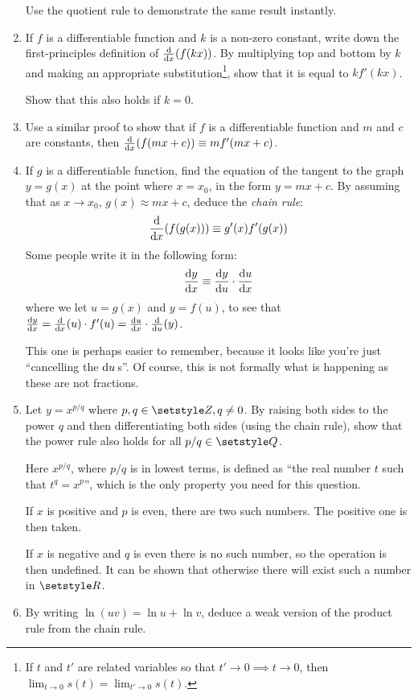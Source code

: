 \begin{enumerate}
  Use the quotient rule to demonstrate the same result instantly.
 \item
  If \(f\) is a differentiable function and \(k\) is a non-zero constant,
  write down the first-principles definition of \(\dv{x}(f(kx))\). By
  multiplying top and bottom by \(k\) and making an appropriate
  substitution\footnote{
   If \(t\) and \(t'\) are related variables so that
   \(t' \to 0 \implies t \to 0\), then
   \(\lim_{t \to 0} s(t) = \lim_{t' \to 0} s(t)\).
  }, show that it is equal to \(kf'(kx)\).

  Show that this also holds if \(k = 0\).
 \item
  Use a similar proof to show that if \(f\) is a differentiable function and
  \(m\) and \(c\) are constants, then \(\dv{x}(f(mx + c)) \equiv mf'(mx + c)\).
 \item
  If \(g\) is a differentiable function, find the equation of the tangent to the
  graph \(y = g(x)\) at the point where \(x = x_0\), in the form
  \(y = mx + c\). By assuming that as \(x \to x_0\), \(g(x) \approx mx + c\),
  deduce the \emph{chain rule}:
  \begin{equation*}
   \dv{x}(f(g(x))) \equiv g'(x) f'(g(x))
  \end{equation*}
  Some people write it in the following form:
  \begin{equation*}
   \dv<y>{x} \equiv \dv<y>{u} \cdot \dv<u>{x}
  \end{equation*}
  where we let \(u = g(x)\) and \(y = f(u)\), to see that
  \(\dv<y>{x}
    = \dv{x}(u) \cdot f'(u)
    = \dv<u>{x} \cdot \dv{u}(y)\).

  This one is perhaps easier to remember, because it looks like you're just
  ``cancelling the \(\mathrm d u\,\)s''. Of course, this is not formally what is
  happening as these are not fractions.
 \item
  Let \(y = x^{p/q}\) where \(p, q \in \Integers, q \ne 0\). By raising both
  sides to the power \(q\) and then differentiating both sides (using the chain
  rule), show that the power rule also holds for all \(p / q \in \Rationals\).

  Here \(x^{p/q}\), where \(p/q\) is in lowest terms, is defined as ``the real
  number \(t\) such that \(t^q = x^p\)'', which is the only property you need
  for this question.

  If \(x\) is positive and \(p\) is even, there are two such numbers. The
  positive one is then taken.

  If \(x\) is negative and \(q\) is even there is no such number, so the
  operation is then undefined. It can be shown that otherwise there will exist
  such a number in \(\Reals\).
 \item
  By writing \(\ln(uv) = \ln u + \ln v\), deduce a weak version of the product
  rule from the chain rule.


\end{enumerate}
